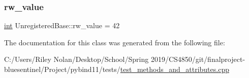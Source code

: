 \mbox{\label{class_unregistered_base_a56882486b2548378b21ef1a94b3eafdc}} 
\subsubsection{\texorpdfstring{rw\_value}{rw\_value}}
{\footnotesize\ttfamily \mbox{\hyperlink{warnings_8h_a74f207b5aa4ba51c3a2ad59b219a423b}{int}} Unregistered\+Base\+::rw\+\_\+value = 42}



The documentation for this class was generated from the following file\+:\begin{DoxyCompactItemize}
\item 
C\+:/\+Users/\+Riley Nolan/\+Desktop/\+School/\+Spring 2019/\+C\+S4850/git/finalproject-\/bluesentinel/\+Project/pybind11/tests/\mbox{\hyperlink{test__methods__and__attributes_8cpp}{test\+\_\+methods\+\_\+and\+\_\+attributes.\+cpp}}\end{DoxyCompactItemize}
